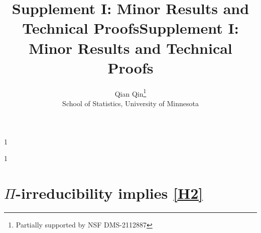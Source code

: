\documentclass[12pt]{article}
\newcommand{\blind}{1}
\begin{document}
	
	
	\def\spacingset#1{\renewcommand{\baselinestretch}%
		{#1}\small\normalsize} \spacingset{1}
	
	
	
	\blind
	{
		\title{\bf Supplement I: Minor Results and Technical Proofs}
		\author{}
		\maketitle
	} \fi
	
	\blind
	{
		\title{\bf Supplement I: Minor Results and Technical Proofs}
		\author{Qian Qin\thanks{
				Partially supported by NSF DMS-2112887}\hspace{.2cm}\\
			School of Statistics, University of Minnesota}
		\maketitle
	} \fi

	\maketitle
	
	\spacingset{1.9} %
	
	\appendix
	
	\renewcommand*{\thetheorem}{\Alph{theorem}}
	\def\theequation{\AlphAlph{\value{equation}}}
	\renewcommand{\thetable}{\Alph{table}}
	
	
	\section{$\Pi$-irreducibility implies \ref{H2}} \label{app:h2}
	
\end{document}
